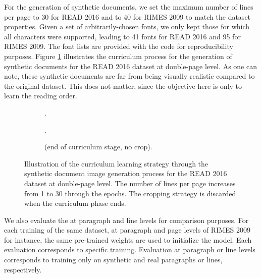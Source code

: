 For the generation of synthetic documents, we set the maximum number of lines per page  to 30 for READ 2016 and to 40 for RIMES 2009 to match the dataset properties. Given a set of arbitrarily-chosen fonts, we only kept those for which all characters were supported, leading to 41 fonts for READ 2016 and 95 for RIMES 2009. The font lists are provided with the code for reproducibility purposes. Figure \ref{fig:syn} illustrates the curriculum process for the generation of synthetic documents for the READ 2016 dataset at double-page level. As one can note, these synthetic documents are far from being visually realistic compared to the original dataset. This does not matter, since the objective here is only to learn the reading order.

\begin{figure}[ht]
    \centering
    \begin{subfigure}[b]{\linewidth}
    {
    \setlength{\fboxsep}{0pt}\setlength{\fboxrule}{1pt}}
    \caption{.}
    \end{subfigure}
    \par\medskip
    \begin{subfigure}[b]{\linewidth}
        {
    \setlength{\fboxsep}{0pt}\setlength{\fboxrule}{1pt}}
    \caption{.}
    \end{subfigure}
    \par\medskip
    \begin{subfigure}[b]{\linewidth}
        {
    \setlength{\fboxsep}{0pt}\setlength{\fboxrule}{1pt}}
    \caption{ (end of curriculum stage, no crop).}
    \end{subfigure}
    
    \caption{Illustration of the curriculum learning strategy through the synthetic document image generation process for the READ 2016 dataset at double-page level. The number of lines per page  increases from 1 to 30 through the epochs. The cropping strategy is discarded when the curriculum phase ends.}
    \label{fig:syn}
\end{figure}

We also evaluate the \modelacc{} at paragraph and line levels for comparison purposes. For each training of the same dataset, at paragraph and page levels of RIMES 2009 for instance, the same pre-trained weights are used to initialize the model. Each evaluation corresponds to specific training. Evaluation at paragraph or line levels corresponds to training only on synthetic and real paragraphs or lines, respectively. 

